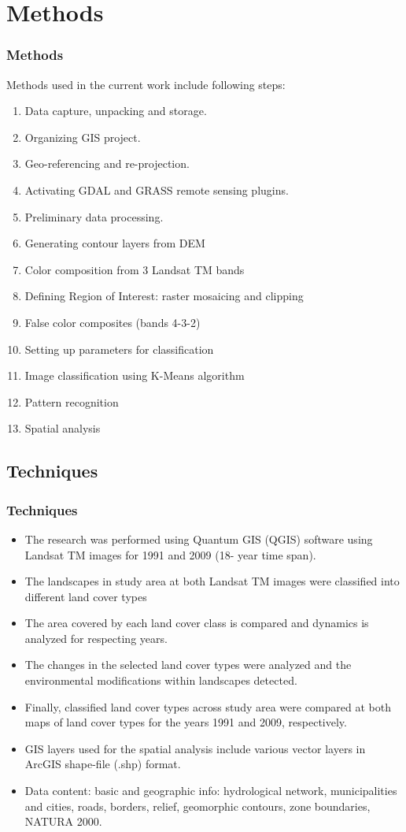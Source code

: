 \documentclass[pdflatex,compress,8pt,
	xcolor={dvipsnames,dvipsnames,svgnames,x11names,table},
	hyperref={
	breaklinks = true, 
	pdfauthor={Lemenkova Polina}, 
	pdfsubject={Preentation}, 
	pdfcreator={Lemenkova Polina}, 
	pdfproducer={Lemenkova Polina}, 
	colorlinks=true,linkcolor=blue, 
	citecolor=NavyBlue, 
	urlcolor = NavyBlue, 
	breaklinks = true}]{beamer}
\begin{document}
\section{Methods}
\begin{frame}\frametitle{Methods}
Methods used in the current work include following steps:
\begin{enumerate}
	\item Data capture, unpacking and storage.
	\item Organizing GIS project.
	\item Geo-referencing and re-projection.
	\item Activating GDAL and GRASS remote sensing plugins.
	\item Preliminary data processing.
	\item Generating contour layers from DEM
	\item Color composition from 3 Landsat TM bands
	\item Defining Region of Interest: raster mosaicing and clipping 
	\item False color composites (bands 4-3-2)
	\item Setting up parameters for classification
	\item Image classification using K-Means algorithm 
	\item Pattern recognition
	\item Spatial analysis
\end{enumerate}
 
\end{frame}

\subsection{Techniques}
\begin{frame}\frametitle{ Techniques}
\begin{itemize}
	\item The research was performed using Quantum GIS (QGIS) software using Landsat TM images for 1991 and 2009 (18- year time span).
	\item The landscapes in study area at both Landsat TM images were classified into different land cover types
	\item The area covered by each land cover class is compared and dynamics is analyzed for respecting years.
	\item The changes in the selected land cover types were analyzed and the environmental modifications within landscapes detected.
	\item Finally, classified land cover types across study area were compared at both maps of land cover types for the years 1991 and 2009, respectively.
	\item GIS layers used for the spatial analysis include various vector layers in ArcGIS shape-file (.shp) format.
	\item Data content: basic and geographic info: hydrological network, municipalities and cities, roads, borders, relief, geomorphic contours, zone boundaries, NATURA 2000.
\end{itemize}
\end{frame}
\end{document}
